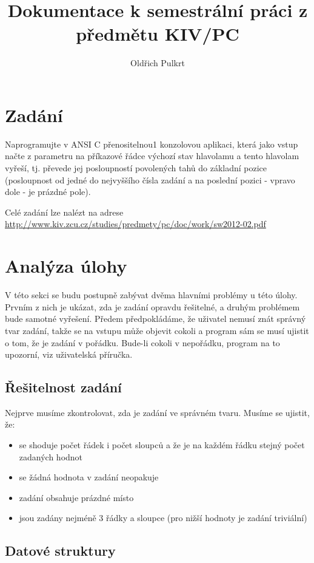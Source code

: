\documentclass[12pt,titlepage]{article}
\author{Oldřich Pulkrt}
\title{Dokumentace k semestrální práci z předmětu KIV/PC}
\begin{document}
\maketitle
\tableofcontents
\newpage

\section{Zadání}
\par
Naprogramujte v ANSI C přenositelnou1 konzolovou aplikaci, která jako vstup načte z parametru na příkazové řádce výchozí stav hlavolamu  a tento hlavolam vyřeší, tj. převede jej posloupností povolených tahů do základní pozice (posloupnost od jedné do nejvyššího čísla zadání a na poslední pozici - vpravo dole - je prázdné pole).
\newline
\par
Celé zadání lze nalézt na adrese \url{http://www.kiv.zcu.cz/studies/predmety/pc/doc/work/sw2012-02.pdf}

\section{Analýza úlohy}
V této sekci se budu postupně zabývat dvěma hlavními problémy u této úlohy. Prvním z nich je ukázat, zda je zadání opravdu řešitelné, a druhým problémem bude samotné vyřešení. Předem předpokládáme, že uživatel nemusí znát správný tvar zadání, takže se na vstupu může objevit cokoli a program sám se musí ujistit o tom, že je zadání v pořádku. Bude-li cokoli v nepořádku, program na to upozorní, viz uživatelská příručka.

\subsection{Řešitelnost zadání}
Nejprve musíme zkontrolovat, zda je zadání ve správném tvaru. Musíme se ujistit, že:
\begin{itemize}
\item se shoduje počet řádek i počet sloupců a že je na každém řádku stejný počet zadaných hodnot
\item se žádná hodnota v zadání neopakuje
\item zadání obsahuje prázdné místo
\item jsou zadány nejméně 3 řádky a sloupce (pro nižší hodnoty je zadání triviální)
\end{itemize}



\subsection{Datové struktury}
\end{document}
